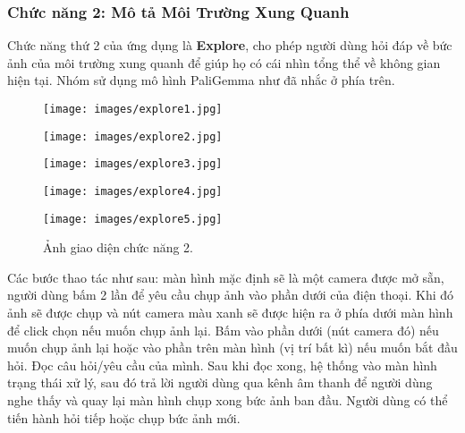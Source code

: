 \documentclass[a4paper,12pt]{article}
\begin{document}
\subsubsection{Chức năng 2: Mô tả Môi Trường Xung Quanh}
Chức năng thứ 2 của ứng dụng là \textbf{Explore}, cho phép người dùng hỏi đáp về bức ảnh của môi trường xung quanh để giúp họ có cái nhìn tổng thể về không gian hiện tại. Nhóm sử dụng mô hình PaliGemma như đã nhắc ở phía trên. 
\begin{figure}[H]
    \centering
    \begin{minipage}{0.32\textwidth}
        \centering
        \texttt{[image: images/explore1.jpg]}
    \end{minipage}
    \hfill
    \begin{minipage}{0.32\textwidth}
        \centering
        \texttt{[image: images/explore2.jpg]}
    \end{minipage}
    \begin{minipage}{0.32\textwidth}
        \centering
        \texttt{[image: images/explore3.jpg]}
    \end{minipage}
    \begin{minipage}{0.32\textwidth}
        \centering
        \texttt{[image: images/explore4.jpg]}
    \end{minipage}
    \begin{minipage}{0.32\textwidth}
        \centering
        \texttt{[image: images/explore5.jpg]}
    \end{minipage}
    
    \caption{Ảnh giao diện chức năng 2.}
\end{figure}
Các bước thao tác như sau: màn hình mặc định sẽ là một camera được mở sẵn, người dùng bấm 2 lần để yêu cầu chụp ảnh vào phần dưới của điện thoại. Khi đó ảnh sẽ được chụp và nút camera màu xanh sẽ được hiện ra ở phía dưới màn hình để click chọn nếu muốn chụp ảnh lại. Bấm vào phần dưới (nút camera đó) nếu muốn chụp ảnh lại hoặc vào phần trên màn hình (vị trí bất kì) nếu muốn bắt đầu hỏi. Đọc câu hỏi/yêu cầu của mình. Sau khi đọc xong, hệ thống vào màn hình trạng thái xử lý, sau đó trả lời người dùng qua kênh âm thanh để người dùng nghe thấy và quay lại màn hình chụp xong bức ảnh ban đầu. Người dùng có thể tiến hành hỏi tiếp hoặc chụp bức ảnh mới.
\end{document}
